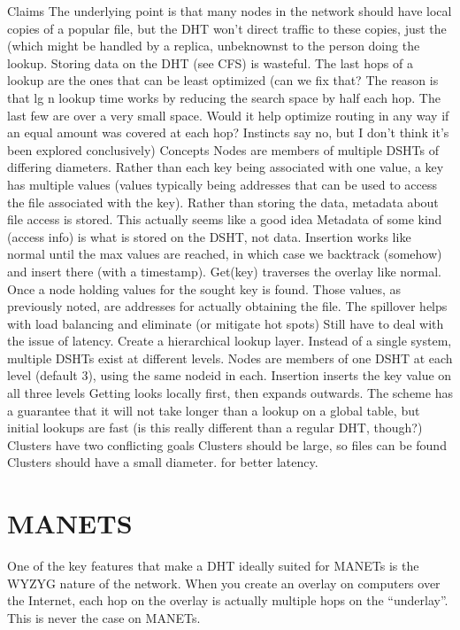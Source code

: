 \documentclass[10pt,letterpaper]{report}
\begin{document}
Claims
The underlying point is  that many nodes in the network should have local copies of a popular file, but the DHT won't direct traffic to these copies, just the  (which  might be handled by a replica, unbeknownst to the person doing the lookup.
Storing data on the DHT (see CFS) is wasteful.
The last hops of a lookup are the ones that can be least optimized (can we fix that?  The reason is that lg n lookup time works by reducing the search space by half each hop.  The last few are over a very small space.  Would it help optimize routing in any way if an equal amount was covered at each hop?  Instincts say no, but I don't think it's been explored conclusively)
Concepts
Nodes are members of multiple DSHTs of differing diameters. 
Rather than each key being associated with one value, a key has multiple values (values typically being addresses that can be used to access the file associated with the key).  Rather than storing the data, metadata about file access is stored.  This actually seems like a good idea
Metadata of some kind (access info) is what is stored on the DSHT, not data.
Insertion works like normal until the max values are reached, in which  case we backtrack (somehow) and insert there (with a timestamp).
Get(key) traverses the overlay like normal.  Once a node holding values for the sought key is found.  Those values, as previously noted, are addresses for actually obtaining the file. 
The spillover helps with load balancing and eliminate (or mitigate hot spots)
Still have to deal with the issue of latency.  Create a hierarchical lookup layer.
Instead of a single system, multiple DSHTs exist at different levels.
Nodes are members of one  DSHT at each level (default 3), using the same nodeid in each.
Insertion inserts the key value on all three levels 
Getting looks locally first, then expands outwards.  The scheme has a guarantee that it will not take longer than a lookup on a  global table, but initial lookups are fast  (is this really different than a regular DHT, though?)
Clusters have two conflicting goals
Clusters should be large, so files can be found
Clusters should have a small diameter. for better latency.







\chapter{MANETS}
One of the key features that make a DHT ideally suited for MANETs is the WYZYG nature of the network.  When you create an overlay on computers over the Internet, each hop on the overlay is actually multiple hops on the ``underlay''.  This is never the case on MANETs.
\end{document}
